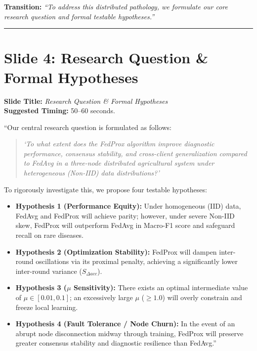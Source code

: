 \documentclass[11pt,a4paper]{article}
\begin{document}
\textbf{Transition:} \textit{``To address this distributed pathology, we formulate our core research question and formal testable hypotheses.''}

\vspace{0.35cm}\hrule\vspace{0.35cm}

\section{Slide 4: Research Question \& Formal Hypotheses}
\textbf{Slide Title:} \textit{Research Question \& Formal Hypotheses} \\
\textbf{Suggested Timing:} 50--60 seconds.

\begin{tcolorbox}[colframe=darkgreen, title=\textbf{What to Say in the Presentation (Literal Script)}]
``Our central research question is formulated as follows:
\begin{quote}
\textit{`To what extent does the FedProx algorithm improve diagnostic performance, consensus stability, and cross-client generalization compared to FedAvg in a three-node distributed agricultural system under heterogeneous (Non-IID) data distributions?'}
\end{quote}

To rigorously investigate this, we propose four testable hypotheses:
\begin{itemize}
    \item \textbf{Hypothesis 1 (Performance Equity):} Under homogeneous (IID) data, FedAvg and FedProx will achieve parity; however, under severe Non-IID skew, FedProx will outperform FedAvg in Macro-F1 score and safeguard recall on rare diseases.
    \item \textbf{Hypothesis 2 (Optimization Stability):} FedProx will dampen inter-round oscillations via its proximal penalty, achieving a significantly lower inter-round variance ($S_{\Delta acc}$).
    \item \textbf{Hypothesis 3 ($\mu$ Sensitivity):} There exists an optimal intermediate value of $\mu \in [0.01, 0.1]$; an excessively large $\mu$ ($\ge 1.0$) will overly constrain and freeze local learning.
    \item \textbf{Hypothesis 4 (Fault Tolerance / Node Churn):} In the event of an abrupt node disconnection midway through training, FedProx will preserve greater consensus stability and diagnostic resilience than FedAvg.''
\end{itemize}
\end{tcolorbox}
\end{document}
